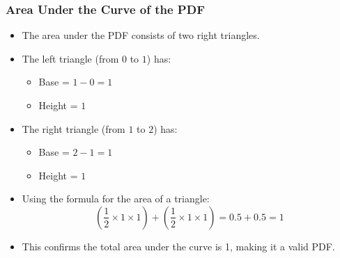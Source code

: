 \documentclass[handout]{beamer} %
\begin{document}
\begin{frame}
\frametitle{Area Under the Curve of the PDF}
    \begin{itemize}
        \item The area under the PDF consists of two right triangles. \pause
        \item The left triangle (from $0$ to $1$) has:
        \begin{itemize}
            \item Base = $1-0=1$
            \item Height = $1$
        \end{itemize} \pause
        \item The right triangle (from $1$ to $2$) has:
        \begin{itemize}
            \item Base = $2-1=1$
            \item Height = $1$
        \end{itemize} \pause
        \item Using the formula for the area of a triangle:
        \[
        \left(\frac{1}{2} \times 1 \times 1\right) + \left(\frac{1}{2} \times 1 \times 1\right) = 0.5+0.5= 1
        \] \pause
        \item This confirms the total area under the curve is 1, making it a valid PDF.
    \end{itemize}
\end{frame}
\end{document}
